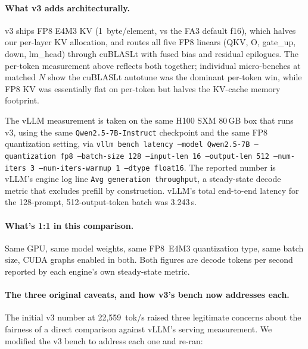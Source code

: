 \paragraph{What v3 adds architecturally.}
v3 ships FP8 E4M3 KV (1~byte/element, vs the FA3 default f16), which
halves our per-layer KV allocation, and routes all five FP8 linears
(QKV, O, gate\_up, down, lm\_head) through cuBLASLt with fused bias and
residual epilogues. The per-token measurement above reflects both
together; individual micro-benches at matched $N$ show the cuBLASLt
autotune was the dominant per-token win, while FP8 KV was essentially
flat on per-token but halves the KV-cache memory footprint.

The vLLM measurement is taken on the same H100 SXM 80\,GB box that runs
v3, using the same \texttt{Qwen2.5-7B-Instruct} checkpoint and the same
FP8 quantization setting, via
\texttt{vllm bench latency --model Qwen2.5-7B --quantization fp8
--batch-size 128 --input-len 16 --output-len 512 --num-iters 3
--num-iters-warmup 1 --dtype float16}. The reported number is vLLM's
engine log line \texttt{Avg generation throughput}, a steady-state decode
metric that excludes prefill by construction. vLLM's total end-to-end
latency for the 128-prompt, 512-output-token batch was 3.243\,s.

\paragraph{What's 1:1 in this comparison.}
Same GPU, same model weights, same FP8~E4M3 quantization type, same batch
size, CUDA graphs enabled in both. Both figures are decode tokens per
second reported by each engine's own steady-state metric.

\paragraph{The three original caveats, and how v3's bench now addresses each.}
The initial v3 number at 22{,}559~tok/s raised three legitimate concerns
about the fairness of a direct comparison against vLLM's serving
measurement. We modified the v3 bench to address each one and re-ran:

